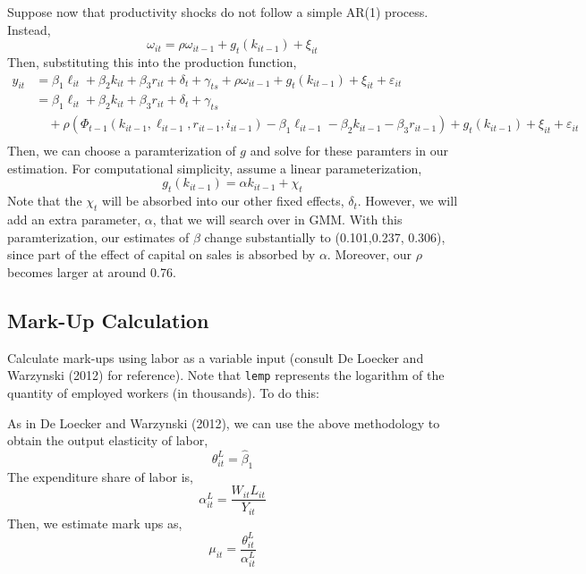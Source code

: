 \documentclass{article}
\begin{document}
\begin{answer}
Suppose now that productivity shocks do not follow a simple AR(1) process. Instead, 
$$\omega_{it} = \rho\omega_{it-1} + g_t(k_{it-1}) + \xi_{it}$$
Then, substituting this into the production function,
\begin{align*}
    y_{it} &= \beta_1 \ell_{it} + \beta_2 k_{it} + \beta_3 r_{it} + \delta_t + \gamma_{ts} + \rho\omega_{it-1} + g_t(k_{it-1}) + \xi_{it} + \varepsilon_{it} \\
    &= \beta_1 \ell_{it} + \beta_2 k_{it} + \beta_3 r_{it} + \delta_t + \gamma_{ts} \\
    &\quad+ \rho(\Phi_{t-1}(k_{it-1}, \ell_{it-1}, r_{it-1},i_{it-1}) - \beta_1 \ell_{it-1} - \beta_2 k_{it-1} - \beta_3 r_{it-1}) + g_t(k_{it-1}) + \xi_{it} + \varepsilon_{it} \\
\end{align*}
Then, we can choose a paramterization of $g$ and solve for these paramters in our estimation. For computational simplicity, assume a linear parameterization,
$$g_t(k_{it-1}) = \alpha k_{it-1} + \chi_t$$
Note that the $\chi_t$ will be absorbed into our other fixed effects, $\delta_t$. However, we will add an extra parameter, $\alpha$, that we will search over in GMM. With this paramterization, our estimates of $\beta$ change substantially to (0.101,0.237, 0.306), since part of the effect of capital on sales is absorbed by $\alpha$. Moreover, our $\rho$ becomes larger at around 0.76.

\end{answer}



\subsection{Mark-Up Calculation}
Calculate mark-ups using labor as a variable input (consult De Loecker and Warzynski (2012) for reference). Note that \texttt{lemp} represents the logarithm of the quantity
of employed workers (in thousands). To do this:

\begin{answer}
As in De Loecker and Warzynski (2012), we can use the above methodology to obtain the output elasticity of labor,
$$\theta_{it}^L = \hat{\beta}_1 $$
The expenditure share of labor is,
$$\alpha_{it}^L = \frac{W_{it}L_{it}}{Y_{it}}$$
Then, we estimate mark ups as,
$$\mu_{it} = \frac{\theta_{it}^L}{\alpha_{it}^L}$$
\end{answer}
\end{document}
